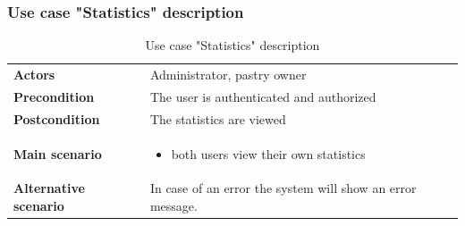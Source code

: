 \documentclass[12pt,a4paper]{report}
\begin{document}
	\subsubsection*{Use case "Statistics" description}
	\begin{table}[H]
		\begin{center}
			\captionsetup[table]{skip=10pt}
			\caption{Use case "Statistics" description}
			\setlength\doublerulesep{0.5pt}
			\begin{tabular}{|  p{5cm}|  p{9cm}|}
				\rowcolor{LightCyan}
				
				\hline
				\multicolumn{2}{c}{Use case "Statistics"}\\
				\hline
				
				\textbf{Actors} &                        
				Administrator, pastry owner 
				\\ \hline
				
				\textbf{Precondition} &                        
				The user is authenticated and authorized
				\\ \hline
				\textbf{Postcondition} &                        
				The statistics are viewed
				\\ \hline
				
				\textbf{Main scenario} &                   
				\begin{itemize}
					\item both users view their own statistics
				
				\end{itemize}
				
				
				\\ \hline
				
				\textbf{Alternative scenario} &                        
				In case of an error the system will show an error message.
				\\ \hline
				
				
			\end{tabular}
			
		\end{center}
		
	\end{table}
\end{document}
